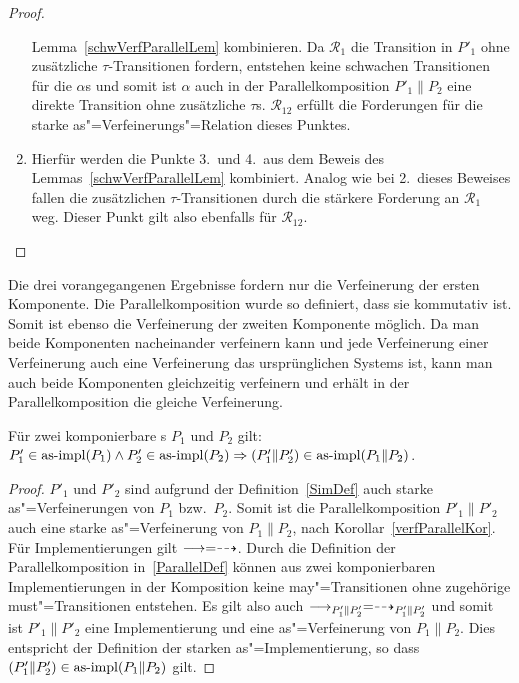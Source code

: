\begin{proof}
\begin{enumerate}
      Lemma~\ref{schwVerfParallelLem} kombinieren. Da $\mathcal{R}_1$ die
      Transition in $P'_1$ ohne zusätzliche $\tau$-Transitionen fordern,
      entstehen keine schwachen Transitionen für die $\alpha$s und somit ist
      $\alpha$ auch in der Parallelkomposition $P'_1\|P_2$ eine direkte
      Transition ohne zusätzliche $\tau$s. $\mathcal{R}_{12}$ erfüllt die
      Forderungen für die starke as"=Verfeinerungs"=Relation dieses Punktes.
    \item Hierfür werden die Punkte 3.\ und 4.\ aus dem Beweis des
      Lemmas~\ref{schwVerfParallelLem} kombiniert. Analog wie bei 2.\ dieses
      Beweises fallen die zusätzlichen $\tau$-Transitionen durch die stärkere
      Forderung an $\mathcal{R}_1$ weg. Dieser Punkt gilt also ebenfalls für
      $\mathcal{R}_{12}$.
  \end{enumerate}
\end{proof}

Die drei vorangegangenen Ergebnisse fordern nur die Verfeinerung der ersten
Komponente. Die Parallelkomposition wurde so definiert, dass sie kommutativ
ist. Somit ist ebenso die Verfeinerung der zweiten Komponente möglich. Da man
beide Komponenten nacheinander verfeinern kann und jede Verfeinerung einer
Verfeinerung auch eine Verfeinerung das ursprünglichen Systems ist, kann man
auch beide Komponenten gleichzeitig verfeinern und erhält in der
Parallelkomposition die gleiche Verfeinerung.

\begin{Kor}
  \label{ImpParallelKor}
  Für zwei komponierbare \MEIO{}s $P_1$ und $P_2$ gilt:
  $P'_1\in\mathrm{as}\text{-}\mathrm{impl} (P_1) \land P'_2 \in\mathrm{as}\text{-}\mathrm{impl} (P_2) \Rightarrow (P'_1\|P'_2)
  \in\mathrm{as}\text{-}\mathrm{impl} (P_1\|P_2)$.
\end{Kor}
\begin{proof}
  $P'_1$ und $P'_2$ sind aufgrund der Definition~\ref{SimDef} auch starke
  as"=Verfeinerungen von $P_1$ bzw.\ $P_2$. Somit ist die Parallelkomposition
  $P'_1\|P'_2$ auch eine starke as"=Verfeinerung von $P_1\|P_2$, nach
  Korollar~\ref{verfParallelKor}. Für Implementierungen gilt $\must =\may$.
  Durch die Definition der Parallelkomposition in~\ref{ParallelDef} können
  aus zwei komponierbaren Implementierungen in der Komposition keine
  may"=Transitionen ohne zugehörige must"=Transitionen entstehen. Es gilt also
  auch $\must _{P'_1\|P'_2} =\may _{P'_1\|P'_2}$ und somit ist $P'_1\|P'_2$
  eine Implementierung und eine as"=Verfeinerung von $P_1\|P_2$. Dies
  entspricht der Definition der starken as"=Implementierung, so dass
  $(P'_1\|P'_2)\in\mathrm{as}\text{-}\mathrm{impl} (P_1\|P_2)$ gilt.
\end{proof}

